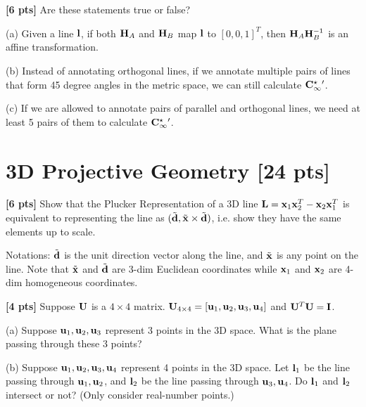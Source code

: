 \documentclass[11pt,addpoints,answers]{exam}
\numberwithin{equation}{section} %
\numberwithin{figure}{section} %
\numberwithin{table}{section} %
\begin{document}
\begin{questions}
\question \textbf{[6 pts]} Are these statements true or false?


(a) Given a line $\mathbf{l}$, if both $\mathbf{H}_A$ and $\mathbf{H}_B$ map $\mathbf{l}$ to $[0,0,1]^T$, then $\mathbf{H}_A\mathbf{H}_B^{-1}$ is an affine transformation. 

(b) Instead of annotating orthogonal lines, if we annotate multiple pairs of lines that form 45 degree angles in the metric space, we can still calculate $\mathbf{C}_\infty^{\star}{}'$.

(c) If we are allowed to annotate pairs of parallel and orthogonal lines, we need at least 5 pairs of them to calculate $\mathbf{C}_\infty^{\star}{}'$.

\begin{tcolorbox}[height fill, width=\textwidth, blank, borderline={0.5pt}{-2pt},halign=left, valign=top, nobeforeafter, size=normal]



\end{tcolorbox}


\section{3D Projective Geometry [24 pts]}

\question \textbf{[6 pts]} Show that the Plucker Representation of a 3D line $\mathbf{L} = \mathbf{x}_1\mathbf{x}_2^T - \mathbf{x}_2\mathbf{x}_1^T$ is equivalent to representing the line as $(\tilde {\mathbf{d}}, \tilde {\mathbf{x}} \times \tilde {\mathbf{d}})$, i.e. show they have the same elements up to scale.

Notations: $\tilde{\mathbf{d}}$ is the unit direction vector along the line, and $\tilde {\mathbf{x}}$ is any point on the line. Note that $\tilde{\mathbf{x}}$ and $\tilde{\mathbf{d}}$ are 3-dim Euclidean coordinates while $\mathbf{x}_1$ and $\mathbf{x}_2$ are 4-dim homogeneous coordinates.

\begin{tcolorbox}[height fill, width=\textwidth, blank, borderline={0.5pt}{-2pt},halign=left, valign=top, nobeforeafter, size=normal]


\end{tcolorbox}

\question \textbf{[4 pts]} Suppose $\mathbf{U}$ is a $4\times 4$ matrix. $\mathbf{U}_{4 \times 4} = [\mathbf{u}_1, \mathbf{u}_2, \mathbf{u}_3, \mathbf{u}_4]$ and $\mathbf{U}^T\mathbf{U} = \mathbf{I}$.

(a) Suppose $\mathbf{u}_1, \mathbf{u}_2, \mathbf{u}_3$ represent 3 points in the 3D space. What is the plane passing through these 3 points?

(b) Suppose $\mathbf{u}_1, \mathbf{u}_2, \mathbf{u}_3, \mathbf{u}_4$ represent 4 points in the 3D space. Let $\mathbf{l}_1$ be the line passing through $\mathbf{u}_1, \mathbf{u}_2$, and $\mathbf{l}_2$ be the line passing through $\mathbf{u}_3, \mathbf{u}_4$. Do $\mathbf{l}_1$ and $\mathbf{l}_2$ intersect or not? (Only consider real-number points.)


\end{questions}
\end{document}
